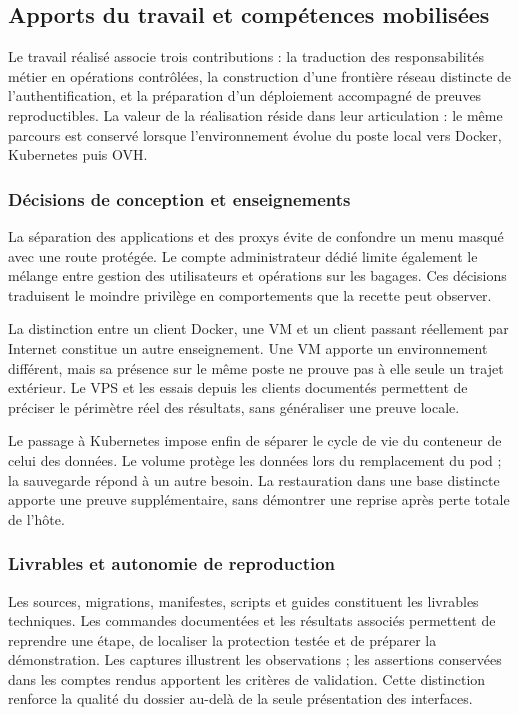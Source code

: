\documentclass[11pt]{extarticle}
\begin{document}
\subsection{Apports du travail et compétences mobilisées}
Le travail réalisé associe trois contributions : la traduction des responsabilités métier en opérations contrôlées, la construction d'une frontière réseau distincte de l'authentification, et la préparation d'un déploiement accompagné de preuves reproductibles. La valeur de la réalisation réside dans leur articulation : le même parcours est conservé lorsque l'environnement évolue du poste local vers Docker, Kubernetes puis OVH.

\subsubsection{Décisions de conception et enseignements}
La séparation des applications et des proxys évite de confondre un menu masqué avec une route protégée. Le compte administrateur dédié limite également le mélange entre gestion des utilisateurs et opérations sur les bagages. Ces décisions traduisent le moindre privilège en comportements que la recette peut observer.

La distinction entre un client Docker, une VM et un client passant réellement par Internet constitue un autre enseignement. Une VM apporte un environnement différent, mais sa présence sur le même poste ne prouve pas à elle seule un trajet extérieur. Le VPS et les essais depuis les clients documentés permettent de préciser le périmètre réel des résultats, sans généraliser une preuve locale.

Le passage à Kubernetes impose enfin de séparer le cycle de vie du conteneur de celui des données. Le volume protège les données lors du remplacement du pod ; la sauvegarde répond à un autre besoin. La restauration dans une base distincte apporte une preuve supplémentaire, sans démontrer une reprise après perte totale de l'hôte.

\subsubsection{Livrables et autonomie de reproduction}
Les sources, migrations, manifestes, scripts et guides constituent les livrables techniques. Les commandes documentées et les résultats associés permettent de reprendre une étape, de localiser la protection testée et de préparer la démonstration. Les captures illustrent les observations ; les assertions conservées dans les comptes rendus apportent les critères de validation. Cette distinction renforce la qualité du dossier au-delà de la seule présentation des interfaces.
\end{document}
